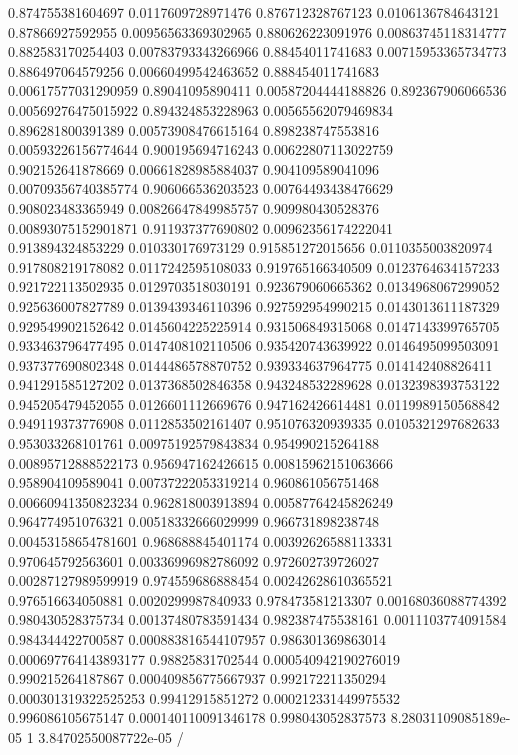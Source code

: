 \begin{table}
\begin{tabu}
\begin{sparkline}{10}
0.874755381604697 0.0117609728971476 0.876712328767123 0.0106136784643121 0.87866927592955 0.00956563369302965 0.880626223091976 0.00863745118314777 0.882583170254403 0.00783793343266966 0.88454011741683 0.00715953365734773 0.886497064579256 0.00660499542463652 0.888454011741683 0.00617577031290959 0.89041095890411 0.00587204444188826 0.892367906066536 0.00569276475015922 0.894324853228963 0.00565562079469834 0.896281800391389 0.00573908476615164 0.898238747553816 0.00593226156774644 0.900195694716243 0.00622807113022759 0.902152641878669 0.00661828985884037 0.904109589041096 0.00709356740385774 0.906066536203523 0.00764493438476629 0.908023483365949 0.00826647849985757 0.909980430528376 0.00893075152901871 0.911937377690802 0.00962356174222041 0.913894324853229 0.010330176973129 0.915851272015656 0.0110355003820974 0.917808219178082 0.0117242595108033 0.919765166340509 0.0123764634157233 0.921722113502935 0.0129703518030191 0.923679060665362 0.0134968067299052 0.925636007827789 0.0139439346110396 0.927592954990215 0.0143013611187329 0.929549902152642 0.0145604225225914 0.931506849315068 0.0147143399765705 0.933463796477495 0.0147408102110506 0.935420743639922 0.0146495099503091 0.937377690802348 0.0144486578870752 0.939334637964775 0.014142408826411 0.941291585127202 0.0137368502846358 0.943248532289628 0.0132398393753122 0.945205479452055 0.0126601112669676 0.947162426614481 0.0119989150568842 0.949119373776908 0.0112853502161407 0.951076320939335 0.0105321297682633 0.953033268101761 0.00975192579843834 0.954990215264188 0.00895712888522173 0.956947162426615 0.00815962151063666 0.958904109589041 0.00737222053319214 0.960861056751468 0.00660941350823234 0.962818003913894 0.00587764245826249 0.964774951076321 0.00518332666029999 0.966731898238748 0.00453158654781601 0.968688845401174 0.00392626588113331 0.970645792563601 0.00336996982786092 0.972602739726027 0.00287127989599919 0.974559686888454 0.00242628610365521 0.976516634050881 0.0020299987840933 0.978473581213307 0.00168036088774392 0.980430528375734 0.00137480783591434 0.982387475538161 0.0011103774091584 0.984344422700587 0.000883816544107957 0.986301369863014 0.000697764143893177 0.98825831702544 0.000540942190276019 0.990215264187867 0.000409856775667937 0.992172211350294 0.000301319322525253 0.99412915851272 0.000212331449975532 0.996086105675147 0.000140110091346178 0.998043052837573 8.28031109085189e-05 1 3.84702550087722e-05 /
\end{sparkline}\\
\bottomrule
\end{tabu}
\end{table}
